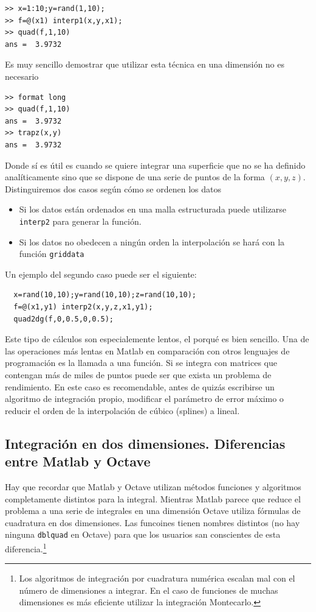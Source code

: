 \begin{verbatim}
>> x=1:10;y=rand(1,10);
>> f=@(x1) interp1(x,y,x1);
>> quad(f,1,10)
ans =  3.9732
\end{verbatim}

Es muy sencillo demostrar que utilizar esta técnica en una dimensión
no es necesario

\begin{verbatim}
>> format long
>> quad(f,1,10)
ans =  3.9732
>> trapz(x,y)
ans =  3.9732
\end{verbatim}

Donde sí es útil es cuando se quiere integrar una superficie que no se
ha definido analíticamente sino que se dispone de una serie de puntos
de la forma $(x,y,z)$.  Distinguiremos dos casos según cómo se ordenen
los datos

\begin{itemize}
\item Si los datos están ordenados en una malla estructurada puede
  utilizarse \texttt{interp2} para generar la función.
\item Si los datos no obedecen a ningún orden la interpolación se hará
  con la función \texttt{griddata}
\end{itemize}

Un ejemplo del segundo caso puede ser el siguiente:

\begin{verbatim}
  x=rand(10,10);y=rand(10,10);z=rand(10,10);
  f=@(x1,y1) interp2(x,y,z,x1,y1);
  quad2dg(f,0,0.5,0,0.5);
\end{verbatim}

Este tipo de cálculos son especialemente lentos, el porqué es bien
sencillo.  Una de las operaciones más lentas en Matlab en comparación
con otros lenguajes de programación es la llamada a una función.  Si
se integra con matrices que contengan más de miles de puntos puede ser
que exista un problema de rendimiento.  En este caso es recomendable,
antes de quizás escribirse un algoritmo de integración propio,
modificar el parámetro de error máximo o reducir el orden de la
interpolación de cúbico (splines) a lineal.

\subsection{Integración en dos dimensiones.  Diferencias entre Matlab
  y Octave}

Hay que recordar que Matlab y Octave utilizan métodos
funciones y algoritmos completamente distintos para la
integral. Mientras Matlab parece que reduce el problema a una serie de
integrales en una dimensión Octave utiliza fórmulas de cuadratura en
dos dimensiones. Las funcoines tienen nombres distintos (no hay
ninguna \texttt{dblquad} en Octave) para que los usuarios san
conscientes de esta diferencia.\footnote{Los algoritmos de integración
por cuadratura numérica escalan mal con el número de dimensiones a
integrar.  En el caso de funciones de muchas dimensiones es más
eficiente utilizar la integración Montecarlo.}

